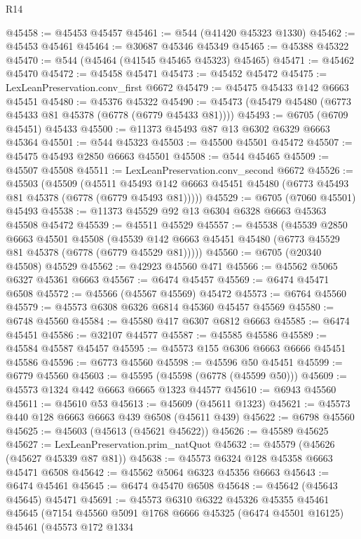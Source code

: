 \begin{lexlean}{R14}
\begin{coremodule}
@45458 := @45453 @45457
@45461 := @544 (@41420 @45323 @1330)
@45462 := @45453 @45461
@45464 := @30687 @45346 @45349
@45465 := @45388 @45322
@45470 := @544 (@45464 (@41545 @45465 @45323) @45465)
@45471 := @45462 @45470
@45472 := @45458 @45471
@45473 := @45452 @45472
@45475 := LexLeanPreservation.conv_first @6672
@45479 := @45475 @45433 @142 @6663 @45451
@45480 := @45376 @45322
@45490 := @45473 (@45479 @45480 (@6773 @45433 @81 @45378 (@6778 (@6779 @45433 @81))))
@45493 := @6705 (@6709 @45451) @45433
@45500 := @11373 @45493 @87 @13 @6302 @6329 @6663 @45364
@45501 := @544 @45323
@45503 := @45500 @45501 @45472
@45507 := @45475 @45493 @2850 @6663 @45501
@45508 := @544 @45465
@45509 := @45507 @45508
@45511 := LexLeanPreservation.conv_second @6672
@45526 := @45503
    (@45509
      (@45511 @45493 @142 @6663 @45451 @45480 (@6773 @45493 @81 @45378 (@6778 (@6779 @45493 @81)))))
@45529 := @6705 (@7060 @45501) @45493
@45538 := @11373 @45529 @92 @13 @6304 @6328 @6663 @45363 @45508 @45472
@45539 := @45511 @45529
@45557 := @45538
    (@45539
      @2850
      @6663
      @45501
      @45508
      (@45539 @142 @6663 @45451 @45480 (@6773 @45529 @81 @45378 (@6778 (@6779 @45529 @81)))))
@45560 := @6705 (@20340 @45508) @45529
@45562 := @42923 @45560 @471
@45566 := @45562 @5065 @6327 @45361 @6663
@45567 := @6474 @45457
@45569 := @6474 @45471 @6508
@45572 := @45566 (@45567 @45569) @45472
@45573 := @6764 @45560
@45579 := @45573 @6308 @6326 @6814 @45360 @45457 @45569
@45580 := @6748 @45560
@45584 := @45580 @417 @6307 @6812 @6663
@45585 := @6474 @45451
@45586 := @32107 @44577
@45587 := @45585 @45586
@45589 := @45584 @45587 @45457
@45595 := @45573 @155 @6306 @6663 @6666 @45451 @45586
@45596 := @6773 @45560
@45598 := @45596 @50 @45451
@45599 := @6779 @45560
@45603 := @45595 (@45598 (@6778 (@45599 @50)))
@45609 := @45573 @1324 @442 @6663 @6665 @1323 @44577
@45610 := @6943 @45560
@45611 := @45610 @53
@45613 := @45609 (@45611 @1323)
@45621 := @45573 @440 @128 @6663 @6663 @439 @6508 (@45611 @439)
@45622 := @6798 @45560
@45625 := @45603 (@45613 (@45621 @45622))
@45626 := @45589 @45625
@45627 := LexLeanPreservation.prim_natQuot
@45632 := @45579 (@45626 (@45627 @45339 @87 @81))
@45638 := @45573 @6324 @128 @45358 @6663 @45471 @6508
@45642 := @45562 @5064 @6323 @45356 @6663
@45643 := @6474 @45461
@45645 := @6474 @45470 @6508
@45648 := @45642 (@45643 @45645) @45471
@45691 := @45573
    @6310
    @6322
    @45326
    @45355
    @45461
    @45645
    (@7154
      @45560
      @5091
      @1768
      @6666
      @45325
      (@6474 @45501 @16125)
      @45461
      (@45573
        @172
        @1334

\end{coremodule}
\end{lexlean}
